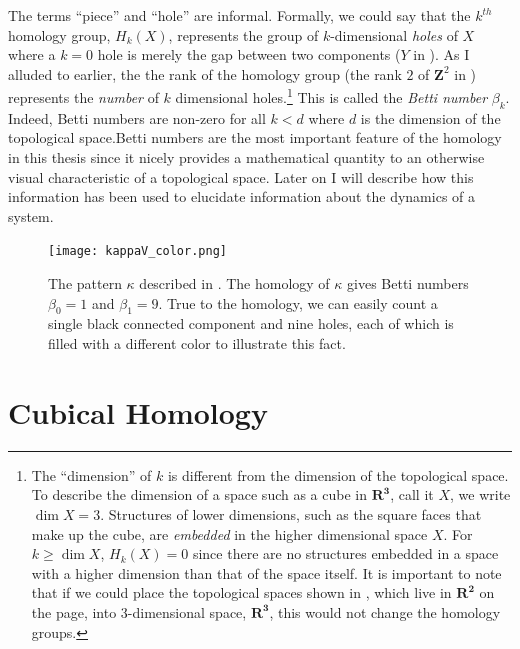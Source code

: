 The terms ``piece'' and ``hole'' are informal. Formally, we could say that the $k^{th}$ homology group, $H_k(X)$, represents the group of $k$-dimensional \textit{holes} of $X$ where a $k = 0$ hole is merely the gap between two components (\eg $Y$ in ). As I alluded to earlier, the the rank of the homology group (\eg the rank $2$ of $\mathbf{Z}^2$ in ) represents the \emph{number} of $k$ dimensional holes.\footnote{The ``dimension'' of $k$ is different from the dimension of the topological space. To describe the dimension of a space such as a cube in $\mathbf{R^3}$, call it $X$, we write $\dim X = 3$. Structures of lower dimensions, such as the square faces that make up the cube, are \textit{embedded} in the higher dimensional space $X$. For $k \geq \dim X$, $H_k(X) = 0$ since there are no structures embedded in a space with a higher dimension than that of the space itself. It is important to note that if we could place the topological spaces shown in , which live in $\mathbf{R^2}$ on the page, into 3-dimensional space, $\mathbf{R^3}$, this would not change the homology groups.} This is called the \textit{Betti number} $\beta_k$. Indeed, Betti numbers are non-zero for all $k < d$ where $d$ is the dimension of the topological space.Betti numbers are the most important feature of the homology in this thesis since it nicely provides a mathematical quantity to an otherwise visual characteristic of a topological space. Later on I will describe how this information has been used to elucidate information about the dynamics of a system.
%
\begin{figure}
	\centering
	\texttt{[image: kappaV\_color.png]}
	\caption{\label{fig:kappaV_color} The pattern $\kappa$ described in . The homology of $\kappa$ gives Betti numbers $\beta_0 = 1$ and $\beta_1 = 9$. True to the homology, we can easily count a single black connected component and nine holes, each of which is filled with a different color to illustrate this fact.}
\end{figure}

\section{Cubical Homology} \label{ch2:cubicalhomology}

